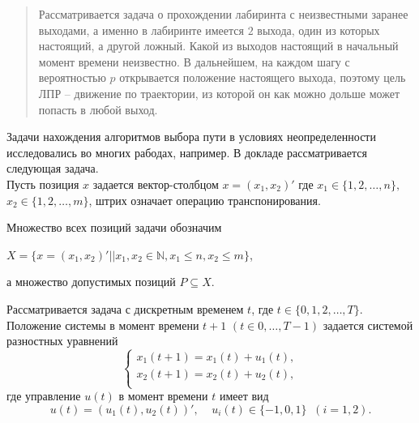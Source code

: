 
\maketitle

\begin{abstract}
Рассматривается задача о прохождении лабиринта с неизвестными заранее выходами, а именно в лабиринте имеется $2$ выхода, один из которых настоящий, а другой ложный. Какой из выходов настоящий в начальный момент времени неизвестно. В дальнейшем, на каждом шагу с вероятностью $p$ открывается положение настоящего выхода, поэтому цель ЛПР --  движение по траектории, из которой он как можно дольше может попасть в любой выход.

\end{abstract}


Задачи нахождения алгоритмов выбора пути в условиях неопределенности исследовались во многих рабодах, например\cite{bar1,bar2}. В докладе рассматривается следующая задача.\\

Пусть позиция $x$ задается вектор-столбцом $x=(x_1,x_2)'$ где $x_1\in \{1,2,\ldots,n\},$ $x_2\in \{1,2,\ldots,m\}$, штрих означает операцию  транспонирования.

Множество всех позиций задачи обозначим
\begin{center}
 $X=\{x=(x_1,x_2)' || x_1, x_2\in \mathbb{N}, x_1\leq n, x_2\leq m\}$,
\end{center}
а множество допустимых позиций $P \subseteq X$.

Рассматривается задача с дискретным временем $t$, где $t\in\{0,1,2,\ldots,T\}$.
Положение системы в момент времени $t+1$  $(t \in 0, \ldots,T-1)$ задается системой разностных уравнений
\begin{equation} \label{eq1}
		\begin{cases}%
			x_1(t+1)=x_1(t)+u_1(t),\\
			x_2(t+1)=x_2(t)+u_2(t),\\
		\end{cases}
\end{equation}
где управление $u(t)$ в момент времени $t$ имеет вид
\begin{equation} \label{eq2}
u(t)= (u_1(t),u_2(t))', \;\;\;\; u_i(t) \in \{-1,0, 1\} \;\; (i=1,2).
\end{equation}

